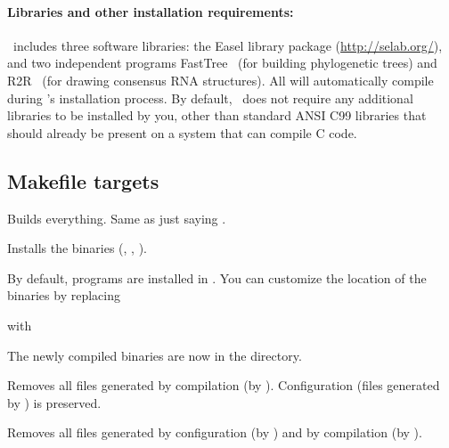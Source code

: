 \paragraph{Libraries and other installation requirements:} \rscape\ includes
three software libraries: the Easel library package
(\url{http://selab.org/}), and two independent programs
FastTree~\citep{Price10} (for building phylogenetic trees) and
R2R~\citep{WeinbergBreaker11} (for drawing consensus RNA
structures). All will automatically compile during \rscape's
installation process.  By default, \rscape\ does not require any
additional libraries to be installed by you, other than standard ANSI
C99 libraries that should already be present on a system that can
compile C code.

\subsection{Makefile targets}

\begin{sreitems}{}

\item[\emprog{all}]
  Builds everything. Same as just saying .

\item[\emprog{install}] 
  Installs the binaries (, , ).

  By default, programs are installed in
  . 
  You can customize the location of the binaries by replacing
  
  
  with
  
  
  The newly compiled binaries are now in the
   directory.\\
  
\item[\emprog{clean}]
  Removes all files generated by compilation (by
  ). Configuration (files generated by
  ) is preserved.

\item[\emprog{distclean}]
  Removes all files generated by configuration (by )
  and by compilation (by ). 

\end{sreitems}

